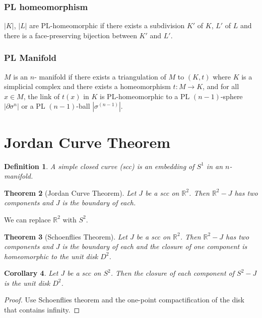 \documentclass{article}
\newtheorem{theorem}{Theorem}
\newtheorem{corollary}[theorem]{Corollary}
\newtheorem{definition}[theorem]{Definition}
\theoremstyle{definition}
\numberwithin{theorem}{section}
\numberwithin{equation}{section}
\begin{document}
\subsubsection{PL homeomorphism}
$|K|$, $|L|$ are PL-homeomorphic if there exists a subdivision $K'$ of $K$, $L'$ of $L$ and there is a face-preserving bijection between $K'$ and $L'$. 

\subsubsection{PL Manifold}
$M$ is an $n$- manifold if there exists a triangulation of $M$ to $(K, t)$ where $K$ is a simplicial complex and there exists a homeomorphism $t : M \rightarrow K$, and for all $x \in M$, the link of $t(x)$ in $K$ is PL-homeomorphic to a PL $(n-1)$-sphere $|\partial \sigma^n|$ or a PL $(n-1)$-ball $|\sigma^{(n-1)}|$. 

\section{Jordan Curve Theorem}

\begin{definition}
    A simple closed curve (scc) is an embedding of $S^1$ in an $n$-manifold. 
\end{definition}

\begin{theorem}[Jordan Curve Theorem]
    Let $J$ be a scc on $\mathbb{R}^2$. Then $\mathbb{R}^2 - J$ has two components and $J$ is the boundary of each. 
\end{theorem}

We can replace $\mathbb{R}^2$ with $S^2$. 

\begin{theorem}[Schoenflies Theorem]
    Let $J$ be a scc on $\mathbb{R}^2$. Then $\mathbb{R}^2 - J$ has two components and $J$ is the boundary of each and the closure of one component is homeomorphic to the unit disk $D^2$.
\end{theorem}

\begin{corollary}
    Let $J$ be a scc on $S^2$. Then the closure of each component of $S^2 - J$ is the unit disk $D^2$. 
\end{corollary}

\begin{proof}
    Use Schoenflies theorem and the one-point compactification of the disk that contains infinity. 
\end{proof}
\end{document}
